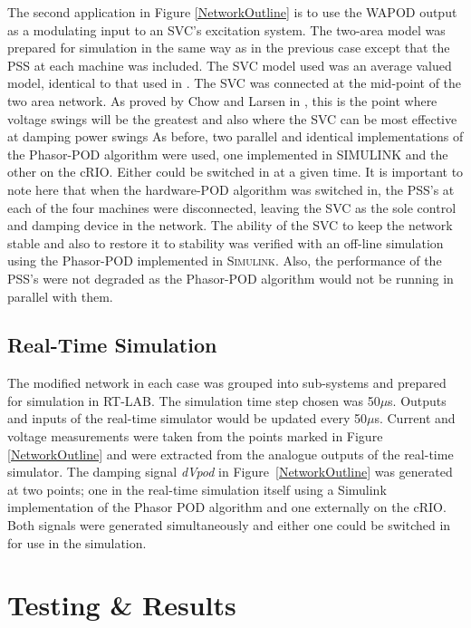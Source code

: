 \documentclass[journal]{IEEEtran}
\begin{document}
The second application in Figure \ref{NetworkOutline} is to use the WAPOD output as a modulating input to an SVC's excitation system. The two-area model was prepared for simulation in the same way as in the previous case except that the PSS at each machine was included. The SVC model used was an average valued model, identical to that used in \cite{PhasorPODImplement}. The SVC was connected at the mid-point of the two area network. As proved by Chow and Larsen in \cite{sVARdamp}, this is the point where voltage swings will be the greatest and also where the SVC can be most effective at damping power swings As before, two parallel and identical implementations of the Phasor-POD algorithm were used, one implemented in SIMULINK and the other on the cRIO. Either could be switched in at a given time. It is important to note here that when the hardware-POD algorithm was switched in, the PSS's at each of the four machines were disconnected, leaving the SVC as the sole control and damping device in the network. The ability of the SVC to keep the network stable and also to restore it to stability was verified with an off-line simulation using the Phasor-POD implemented in \textsc{Simulink}. Also, the performance of the PSS's were not degraded as the Phasor-POD algorithm would not be running in parallel with them.

\subsection{Real-Time Simulation}
The modified network in each case was grouped into sub-systems and prepared for simulation in RT-LAB. The simulation time step chosen was 50$\mu$s. Outputs and inputs of the real-time simulator would be updated every 50$\mu$s. Current and voltage measurements were taken from the points marked in Figure \ref{NetworkOutline} and were extracted from the analogue outputs of the real-time simulator. The damping signal \emph{dVpod} in Figure~\ref{NetworkOutline} was generated at two points; one in the real-time simulation itself using a Simulink implementation of the Phasor POD algorithm and one externally on the cRIO. Both signals were generated simultaneously and either one could be switched in for use in the simulation.

\section{Testing \& Results}\label{Results}
\end{document}
